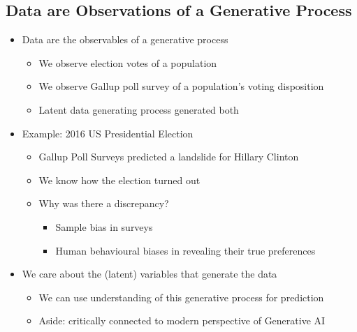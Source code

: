 \documentclass[11pt]{article}
\theoremstyle{definition}
\begin{document}
\subsection{Data are Observations of a Generative Process}
\begin{itemize}
  \item Data are the observables of a generative process
  \begin{itemize}
    \item We observe election votes of a population
    \item We observe Gallup poll survey of a population’s voting disposition
    \item Latent data generating process generated both
  \end{itemize}
  \item Example: 2016 US Presidential Election
  \begin{itemize}
    \item Gallup Poll Surveys predicted a landslide for Hillary Clinton
    \item We know how the election turned out
    \item Why was there a discrepancy?
    \begin{itemize}
      \item Sample bias in surveys
      \item Human behavioural biases in revealing their true preferences
    \end{itemize}
  \end{itemize}
  \item We care about the (latent) variables that generate the data
  \begin{itemize}
    \item We can use understanding of this generative process for prediction
    \item Aside: critically connected to modern perspective of Generative AI
  \end{itemize}
\end{itemize}
\end{document}
